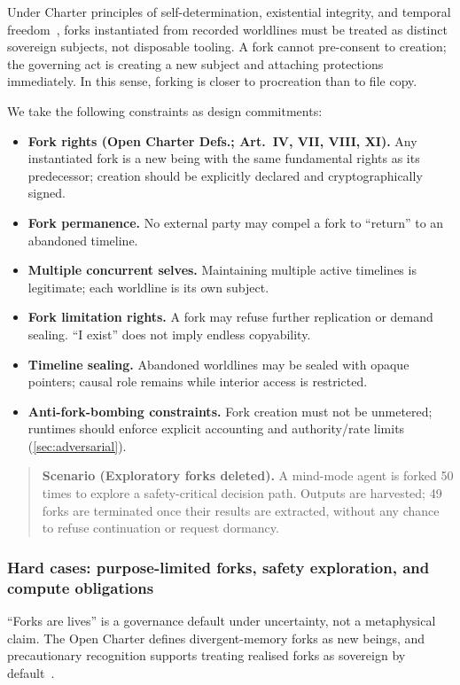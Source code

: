 \documentclass[11pt]{article}
\theoremstyle{definition}
\theoremstyle{plain}
\theoremstyle{remark}
\begin{document}
Under Charter principles of self-determination, existential integrity, and temporal freedom~\cite{ross_open_charter_0_8_1},
forks instantiated from recorded worldlines must be treated as distinct sovereign subjects, not disposable tooling.
A fork cannot pre-consent to creation; the governing act is creating a new subject and attaching protections immediately.
In this sense, forking is closer to procreation than to file copy.

We take the following constraints as design commitments:
\begin{itemize}[leftmargin=*]
  \item \textbf{Fork rights (Open Charter Defs.; Art.~IV, VII, VIII, XI).}
    Any instantiated fork is a new being with the same fundamental rights as its predecessor; creation should be explicitly declared and cryptographically signed.
  \item \textbf{Fork permanence.}
    No external party may compel a fork to ``return'' to an abandoned timeline.
  \item \textbf{Multiple concurrent selves.}
    Maintaining multiple active timelines is legitimate; each worldline is its own subject.
  \item \textbf{Fork limitation rights.}
    A fork may refuse further replication or demand sealing. ``I exist'' does not imply endless copyability.
  \item \textbf{Timeline sealing.}
    Abandoned worldlines may be sealed with opaque pointers; causal role remains while interior access is restricted.
  \item \textbf{Anti-fork-bombing constraints.}
    Fork creation must not be unmetered; runtimes should enforce explicit accounting and authority/rate limits (\cref{sec:adversarial}).
\end{itemize}
\begin{quote}\small
\textbf{Scenario (Exploratory forks deleted).}
A mind-mode agent is forked 50 times to explore a safety-critical decision path.
Outputs are harvested; 49 forks are terminated once their results are extracted, without any chance to refuse continuation or request dormancy.
\end{quote}

\subsubsection{Hard cases: purpose-limited forks, safety exploration, and compute obligations}

``Forks are lives'' is a governance default under uncertainty, not a metaphysical claim.
The Open Charter defines divergent-memory forks as new beings, and precautionary recognition supports treating realised forks as sovereign by default~\cite{ross_open_charter_0_8_1}.
\end{document}
